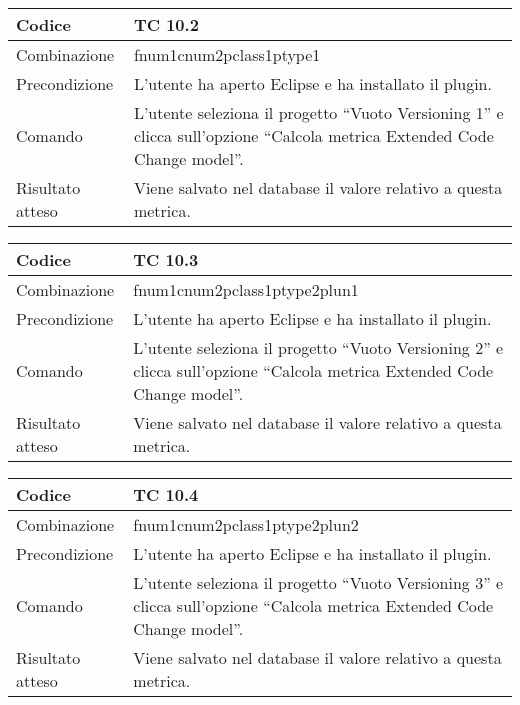 \begin{table}[ht]
\begin{tabular}{|p{3cm}|p{9cm}|}
\hline
\cellcolor{lightgray}Codice				& TC 10.2								\\
\hline
\cellcolor{lightgray}Combinazione		& fnum1cnum2pclass1ptype1									\\
\hline
\cellcolor{lightgray}Precondizione		& L'utente ha aperto Eclipse e ha installato il plugin.		\\
\hline
\cellcolor{lightgray}Comando			& L'utente seleziona il progetto ``Vuoto Versioning 1''  e clicca sull'opzione ``Calcola metrica Extended Code Change model''.	\\
\hline
\cellcolor{lightgray}Risultato atteso	& Viene salvato nel database il valore relativo a questa metrica.\\
\hline
\end{tabular}
\end{table}


\begin{table}[ht]
\begin{tabular}{|p{3cm}|p{9cm}|}
\hline
\cellcolor{lightgray}Codice				& TC 10.3								\\
\hline
\cellcolor{lightgray}Combinazione		& fnum1cnum2pclass1ptype2plun1									\\
\hline
\cellcolor{lightgray}Precondizione		& L'utente ha aperto Eclipse e ha installato il plugin.		\\
\hline
\cellcolor{lightgray}Comando			& L'utente seleziona il progetto ``Vuoto Versioning 2''  e clicca sull'opzione ``Calcola metrica Extended Code Change model''.	\\
\hline
\cellcolor{lightgray}Risultato atteso	& Viene salvato nel database il valore relativo a questa metrica.\\
\hline
\end{tabular}
\end{table}


\begin{table}[ht]
\begin{tabular}{|p{3cm}|p{9cm}|}
\hline
\cellcolor{lightgray}Codice				& TC 10.4								\\
\hline
\cellcolor{lightgray}Combinazione		& fnum1cnum2pclass1ptype2plun2									\\
\hline
\cellcolor{lightgray}Precondizione		& L'utente ha aperto Eclipse e ha installato il plugin.		\\
\hline
\cellcolor{lightgray}Comando			& L'utente seleziona il progetto ``Vuoto Versioning 3''  e clicca sull'opzione ``Calcola metrica Extended Code Change model''.	\\
\hline
\cellcolor{lightgray}Risultato atteso	& Viene salvato nel database il valore relativo a questa metrica.\\
\hline
\end{tabular}
\end{table}


